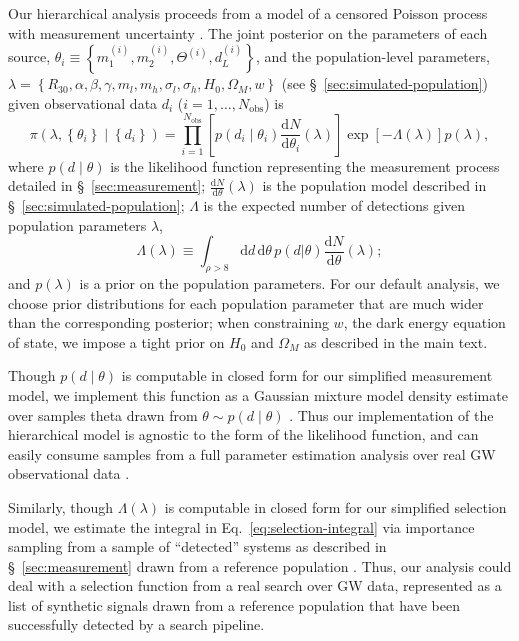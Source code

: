 \documentclass[modern]{aastex62}
\newcommand{\dd}{\mathrm{d}}
\newcommand{\diff}[2]{\frac{\dd #1}{\dd #2}}
\begin{document}
Our hierarchical analysis proceeds from a model of a censored Poisson process
with measurement uncertainty \citep{Loredo2004,Mandel2019}.  The joint posterior
on the parameters of each source, $\theta_i \equiv \left\{ m_1^{(i)}, m_2^{(i)},
\Theta^{(i)}, d_L^{(i)} \right\}$, and the population-level parameters, $\lambda
= \left\{ R_{30}, \alpha, \beta, \gamma, m_l, m_h, \sigma_l, \sigma_h, H_0,
\Omega_M, w \right\}$ (see \S\ \ref{sec:simulated-population}) given
observational data $d_i$ ($i = 1, \ldots, N_\mathrm{obs}$) is
%
\begin{equation}
  \pi \left( \lambda, \left\{ \theta_i \right\} \mid \left\{ d_i \right\} \right) = \prod_{i=1}^{N_\mathrm{obs}} \left[ p\left( d_i \mid \theta_i \right) \diff{N}{\theta_i}(\lambda) \right] \exp\left[ - \Lambda(\lambda) \right] p\left( \lambda \right),
\end{equation}
%
where $p\left( d \mid \theta \right)$ is the likelihood function representing
the measurement process detailed in \S\ \ref{sec:measurement};
$\diff{N}{\theta}(\lambda)$ is the population model described in \S\
\ref{sec:simulated-population}; $\Lambda$ is the expected number of detections
given population parameters $\lambda$,
%
\begin{equation}
  \label{eq:selection-integral}
  \Lambda(\lambda) \equiv \int_{\rho > 8} \dd d \, \dd \theta \, p\left( d | \theta \right) \diff{N}{\theta}\left(\lambda \right);
\end{equation}
%
and $p(\lambda)$ is a prior on the population parameters.  For our default
analysis, we choose prior distributions for each population parameter that are
much wider than the corresponding posterior; when constraining $w$, the dark
energy equation of state, we impose a tight prior on $H_0$ and $\Omega_M$ as
described in the main text.

Though $p\left( d \mid \theta \right)$ is computable in closed form for our
simplified measurement model, we implement this function as a Gaussian mixture
model density estimate over samples theta drawn from $\theta \sim p\left( d \mid
\theta \right)$ \citep{SciKitLearn}.  Thus our implementation of the
hierarchical model is agnostic to the form of the likelihood function, and can
easily consume samples from a full parameter estimation analysis over real
\ac{GW} observational data \citep{GWTC-1}.

Similarly, though $\Lambda(\lambda)$ is computable in closed form for our
simplified selection model, we estimate the integral in Eq.\
\eqref{eq:selection-integral} via importance sampling from a sample of
``detected'' systems as described in \S\ \ref{sec:measurement} drawn from a
reference population \citep{Farr2019}.  Thus, our analysis could deal with a
selection function from a real search over \ac{GW} data, represented as a list
of synthetic signals drawn from a reference population that have been
successfully detected by a search pipeline.
\end{document}
